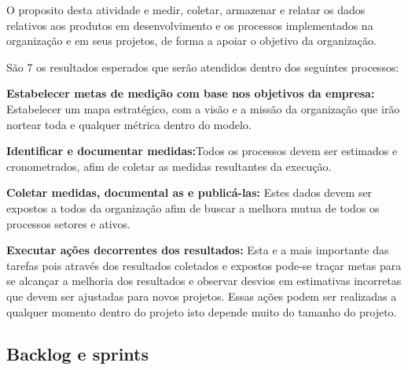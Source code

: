 \documentclass[	DIV=calc,%
							paper=a4,%
							fontsize=12pt,%
							onecolumn]{scrartcl}	 					%
\begin{document}
O proposito desta atividade e medir, coletar, armazenar e relatar os dados relativos aos produtos em desenvolvimento e os processos implementados na organização e em seus projetos, de forma a apoiar o objetivo da organização.


São 7 os resultados esperados que serão atendidos dentro dos seguintes processos:


{\textbf{Estabelecer metas de medição com base nos objetivos da empresa:}} Estabelecer um mapa estratégico, com a visão e a missão  da organização que irão nortear toda e qualquer métrica dentro do modelo.


{\textbf{Identificar e documentar medidas:}}Todos os processos devem ser estimados e cronometrados, afim de coletar as medidas resultantes da execução.


{\textbf{Coletar medidas, documental as e publicá-las: }} Estes dados devem ser expostos a todos da organização afim de buscar a melhora mutua de todos os processos setores e ativos. 


{\textbf{Executar ações decorrentes dos resultados:}} Esta e a mais importante das tarefas pois através dos resultados coletados e expostos pode-se traçar metas para se alcançar a melhoria dos resultados e observar desvios em estimativas incorretas que devem ser ajustadas para novos projetos. Essas ações podem ser realizadas a qualquer momento dentro do projeto isto depende muito do tamanho do projeto.


\subsection{Backlog e sprints}
\end{document}
